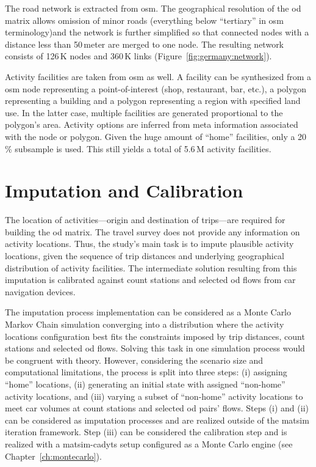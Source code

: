 The road network is extracted from \gls{osm}. The geographical resolution of the \gls{od} matrix allows omission of minor roads (everything below ``tertiary'' in \gls{osm} terminology)and the network is further simplified so that connected nodes with a distance less than 50\,meter are merged to one node. The resulting network consists of 126\,K nodes and 360\,K links (Figure~\ref{fig:germany:network}).

Activity facilities are taken from \gls{osm} as well. A facility can be synthesized from a \gls{osm} node representing a point-of-interest (shop, restaurant, bar, etc.), a polygon representing a building and a polygon representing a region with specified land use. In the latter case, multiple facilities are generated proportional to the polygon's area. Activity options are inferred from meta information associated with the node or polygon. Given the huge amount of ``home'' facilities, only a 20\,\% subsample is used. This still yields a total of 5.6\,M activity facilities.

\section{Imputation and Calibration}

The location of activities---origin and destination of trips---are required for building the \gls{od} matrix. The travel survey does not provide any information on activity locations. Thus, the study's main task is to impute plausible activity locations, given the sequence of trip distances and underlying geographical distribution of activity facilities. The intermediate solution resulting from this imputation is calibrated against count stations and selected \gls{od} flows from car navigation devices.

The imputation process implementation can be considered as a Monte Carlo Markov Chain simulation converging into a distribution where the activity locations configuration best fits the constraints imposed by trip distances, count stations and selected \gls{od} flows. Solving this task in one simulation process would be congruent with theory. However, considering the scenario size and computational limitations, the process is split into three steps: (i) assigning ``home'' locations, (ii) generating an initial state with assigned ``non-home'' activity locations, and (iii) varying a subset of ``non-home'' activity locations to meet car volumes at count stations and selected \gls{od} pairs' flows. Steps (i) and (ii) can be considered as  imputation processes and are realized outside of the \gls{matsim} iteration framework. Step (iii) can be considered the calibration step and is realized with a \gls{matsim}-\gls{cadyts} setup configured as a Monte Carlo engine (see Chapter~\ref{ch:montecarlo}).


